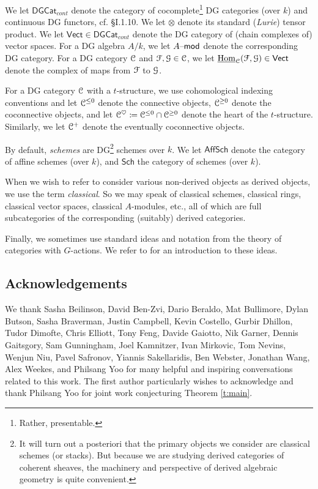 \documentclass[reqno,11pt]{amsart}
\numberwithin{equation}{subsection}
\theoremstyle{remark}
\newcommand{\sC}{{\EuScript C}}
\newcommand{\sF}{{\EuScript F}}
\newcommand{\sG}{{\EuScript G}}
\newcommand{\on}{\operatorname}
\newcommand{\ul}{\underline}
\newcommand{\mathendash}{\text{\textendash}}
\newcommand{\Hom}{\on{Hom}}
\newcommand{\Vect}{\mathsf{Vect}}
\renewcommand{\mod}{\mathendash\mathsf{mod}}
\newcommand{\DGCat}{\mathsf{DGCat}}
\newcommand{\heart}{\heartsuit}
\newcommand{\Sch}{\mathsf{Sch}}
\newcommand{\AffSch}{\mathsf{AffSch}}
\begin{document}
We let $\DGCat_{cont}$ denote the category of cocomplete\footnote{Rather, presentable.}
DG categories (over $k$) and continuous DG functors, cf. \cite{grbook} \S I.1.10.
We let $\otimes$ denote its standard (\emph{Lurie}) tensor product. 
We let $\Vect \in \DGCat_{cont}$ denote the DG category of (chain complexes
of) vector spaces. For a DG algebra $A/k$, we let $A\mod$ denote the
corresponding DG category. 
For a DG category $\sC$ and $\sF,\sG \in \sC$, we let
$\ul{\Hom}_{\sC}(\sF,\sG) \in \Vect$ denote the complex of
maps from $\sF$ to $\sG$. 

For a DG category $\sC$ with a $t$-structure, we use cohomological
indexing conventions and let $\sC^{\leq 0}$ denote the connective
objects, $\sC^{\geq 0}$ denote the coconnective objects, and
let $\sC^{\heart} \coloneqq \sC^{\leq 0} \cap \sC^{\geq 0}$ denote
the heart of the $t$-structure. Similarly, we let 
$\sC^+$ denote the eventually coconnective objects.


By default, \emph{schemes} are DG\footnote{It will turn out a posteriori 
that the primary objects
we consider are classical schemes (or stacks). But because we are studying
derived categories of coherent sheaves, the machinery and perspective of derived
algebraic geometry is quite convenient.}  
 schemes over $k$. We let
$\AffSch$ denote the category of affine schemes (over $k$),
and $\Sch$ the category of schemes (over $k$).

When we wish to refer to consider various non-derived objects as 
derived objects, we use the
term \emph{classical}. So we may speak of classical schemes, classical rings,
classical vector spaces, classical $A$-modules, etc., all of which 
are full subcategories of the corresponding (suitably) derived categories.

Finally, we sometimes use standard ideas and notation from the theory of
categories with $G$-actions. We refer to \cite{dario-*/!} for an introduction
to these ideas.  

\subsection{Acknowledgements}

We thank Sasha Beilinson, David Ben-Zvi, Dario Beraldo, 
Mat Bullimore, Dylan Butson, Sasha Braverman,
Justin Campbell, Kevin Costello, Gurbir Dhillon, Tudor Dimofte, Chris Elliott,
Tony Feng, Davide Gaiotto, Nik Garner, Dennis Gaitsgory, Sam Gunningham, 
Joel Kamnitzer, Ivan Mirkovic, Tom Nevins, Wenjun Niu, Pavel Safronov, 
Yiannis Sakellaridis, Ben Webster, Jonathan Wang, Alex Weekes, and
Philsang Yoo for many helpful and inspiring conversations related
to this work. The first author particularly wishes to acknowledge and thank 
Philsang Yoo for joint work conjecturing Theorem \ref{t:main}. 
\end{document}
